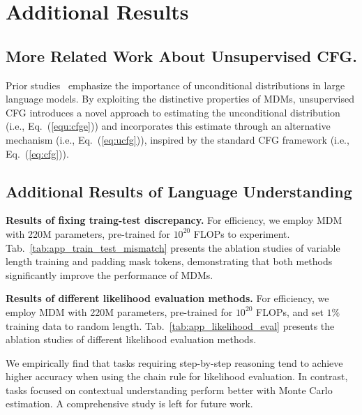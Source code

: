 \documentclass{article} %
\begin{document}
\section{Additional Results}
\subsection{More Related Work About Unsupervised CFG.} 
\label{app:sec_related_work_ucfg}
Prior studies~\cite{zhao2021calibrate, holtzman2021surface} emphasize the importance of unconditional distributions in large language models. By exploiting the distinctive properties of MDMs, unsupervised CFG introduces a novel approach to estimating the unconditional distribution (i.e., Eq.~(\ref{equ:cfge})) and incorporates this estimate through an alternative mechanism (i.e., Eq.~(\ref{eq:ucfg})), inspired by the standard CFG framework (i.e., Eq.~(\ref{eq:cfg})).


\subsection{Additional Results of Language Understanding}
\label{app:sec_results_qa}
\textbf{Results of fixing traing-test discrepancy.}  For efficiency, we employ MDM with 220M parameters, pre-trained for $10^{20}$ FLOPs to experiment. Tab.~\ref{tab:app_train_test_mismatch} presents the ablation studies of variable length training and padding mask tokens, demonstrating that both methods significantly improve the performance of MDMs.



\textbf{Results of different likelihood evaluation methods.} For efficiency, we employ MDM with 220M parameters, pre-trained for $10^{20}$ FLOPs, and set $1\%$ training data to random length. Tab.~\ref{tab:app_likelihood_eval} presents the ablation studies of different likelihood evaluation methods.

We empirically find that tasks requiring step-by-step reasoning tend to achieve higher accuracy when using the chain rule for likelihood evaluation. In contrast, tasks focused on contextual understanding perform better with Monte Carlo estimation. A comprehensive study is left for future work.
\end{document}
